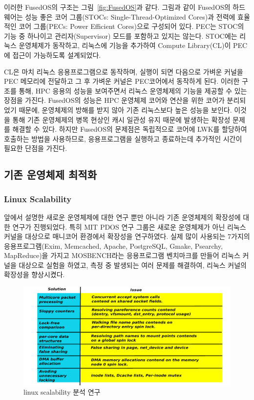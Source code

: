 이러한 FusedOS의 구조는 그림~\ref{fig:FusedOS}과 같다. 
그림과 같이 FusedOS의 하드웨어는 성능 좋은 코어 그룹(STOCs: Single-Thread-Optimized Cores)과
전력에 효율적인 코어 그룹(PECs: Power Efficient Cores)으로 구성되어 있다.
PEC는 STOC의 기능 중 하나이고 관리자(Supervisor) 모드를 포함하고 있지는 않는다. 
STOC에는 리눅스 운영체제가 동작하고, 리눅스에 기능을 추가하여 Compute Library(CL)이 PEC에 
접근이 가능하도록 설계되었다.

CL은 마치 리눅스 응용프로그램으로 동작하며, 실행이 되면 다음으로 가벼운 커널을 PEC 메모리에 
전달하고 그 후 가벼운 커널은 PEC코어에서 동작하게 된다.
이러한 구조를 통해, HPC 응용의 성능을 보여주면서 리눅스 운영체제의 기능을 제공할 수 있는 장점을 가진다. 
FusedOS의 성능은 HPC 운영체제 코어와 연산을 위한 코어가 분리되었기 때문에, 운영체제의 
방해를 받지 않아 기존 리눅스보다 높은 성능을 보인다.
이것을 통해 기존 운영체제의 병목 현상인 캐시 일관성 유지 때문에 발생하는 확장성 문제를 해결할 수 있다.
하지만 FusedOS의 문제점은 독립적으로 코어에 LWK를 할당하여 호출하는 방법을 사용하므로,  
응용프로그램을 실행하고 종료하는데 추가적인 시간이 필요한 단점을 가진다.

\subsection{기존 운영체제 최적화}

\subsubsection{Linux Scalability}

앞에서 설명한 새로운 운영체제에 대한 연구 뿐만 아니라 기존 운영체제의 확장성에 대한 연구가 진행되었다. 
특히 MIT PDOS 연구 그룹은 새로운 운영체제가 아닌 리눅스 커널을 대상으로 매니코어 환경에서 확장성을 연구하였다.
실제 많이 사용되는 7가지의 응용프로그램(Exim, Memcached, Apache, PostgreSQL, Gmake, Psearchy,
MapReduce)을 가지고 MOSBENCH라는 응용프로그램 벤치마크를 만들어 리눅스 커널을 대상으로 실험을 
하였고, 측정 중 발생되는 여러 문제를 해결하여, 리눅스 커널의 확장성을 향상시켰다.

\begin{figure}[h!]
    \centering
    \includegraphics[width=1\textwidth]{fig/linux/linux}
    \caption{linux scalability 분석 연구}
  \label{fig:linux}
\end{figure}

